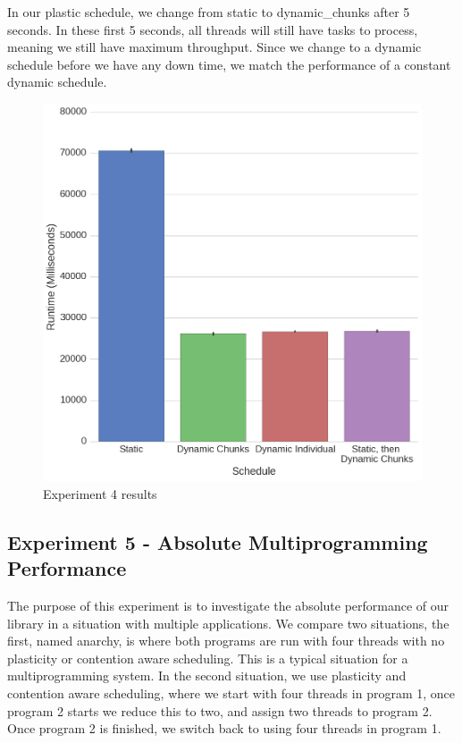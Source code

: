 In our plastic schedule, we change from static to dynamic\_chunks after 5 seconds. In these first 5 seconds, all threads will still have tasks to process, meaning we still have maximum throughput. Since we change to a dynamic schedule before we have any down time, we match the performance of a constant dynamic schedule.



\begin{figure}
	\centering
	\includegraphics[width=\textwidth]{graphics/experiment4.png}
	\caption{Experiment 4 results}
	\label{fig:results_ex4}
\end{figure}





\subsection{Experiment 5 - Absolute Multiprogramming Performance}

The purpose of this experiment is to investigate the absolute performance of our library in a situation with multiple applications. We compare two situations, the first, named anarchy, is where both programs are run with four threads with no plasticity or contention aware scheduling. This is a typical situation for a multiprogramming system. In the second situation, we use plasticity and contention aware scheduling, where we start with four threads in program 1, once program 2 starts we reduce this to two, and assign two threads to program 2. Once program 2 is finished, we switch back to using four threads in program 1.


